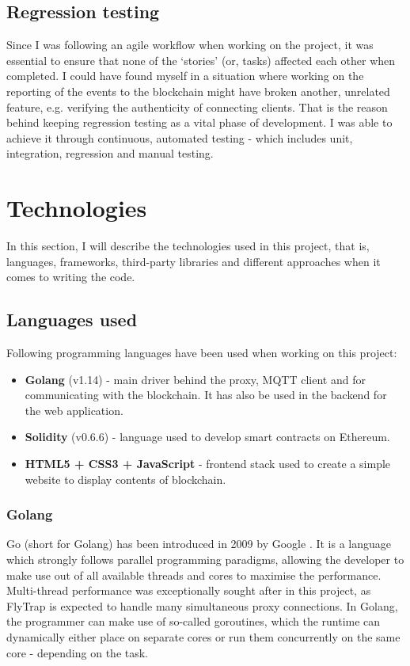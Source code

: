 \subsection{Regression testing}

Since I was following an agile workflow when working on the project, it was essential to ensure that none of the `stories' (or, tasks) affected each other when completed. I could have found myself in a situation where working on the reporting of the events to the blockchain might have broken another, unrelated feature, e.g. verifying the authenticity of connecting clients. That is the reason behind keeping regression testing as a vital phase of development. I was able to achieve it through continuous, automated testing - which includes unit, integration, regression and manual testing.

\section{Technologies}

In this section, I will describe the technologies used in this project, that is, languages, frameworks, third-party libraries and different approaches when it comes to writing the code.

\subsection{Languages used}

Following programming languages have been used when working on this project:
\begin{itemize}
 \item \textbf{Golang} (v1.14) - main driver behind the proxy, MQTT client and for communicating with the blockchain. It has also be used in the backend for the web application.
 \item \textbf{Solidity} (v0.6.6) - language used to develop smart contracts on Ethereum.
 \item \textbf{HTML5 + CSS3 + JavaScript} - frontend stack used to create a simple website to display contents of blockchain.
\end{itemize}

\subsubsection{Golang}
Go (short for Golang) has been introduced in 2009 by Google \cite{team2009go}. It is a language which strongly follows parallel programming paradigms, allowing the developer to make use out of all available threads and cores to maximise the performance. Multi-thread performance was exceptionally sought after in this project, as FlyTrap is expected to handle many simultaneous proxy connections. In Golang, the programmer can make use of so-called goroutines, which the runtime can dynamically either place on separate cores or run them concurrently on the same core - depending on the task.

